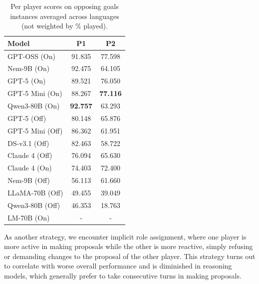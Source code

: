 \documentclass[../main.tex]{subfiles}
\begin{document}
\begin{table}[ht]
\centering
\footnotesize
\setlength{\tabcolsep}{4pt}
\begin{tabular}{l cc}
\hline
\textbf{Model} & \textbf{P1} & \textbf{P2} \\
\hline
GPT-OSS (On) & 91.835 & 77.598 \\
Nem-9B (On) & 92.475 & 64.105 \\
GPT-5 (On) & 89.521 & 76.050 \\
GPT-5 Mini (On) & 88.267 & \textbf{77.116} \\
Qwen3-80B (On) & \textbf{92.757} & 63.293 \\
GPT-5 (Off) & 80.148 & 65.876 \\
GPT-5 Mini (Off) & 86.362 & 61.951 \\
DS-v3.1 (Off) & 82.463 & 58.722 \\
Claude 4 (Off) & 76.094 & 65.630 \\
Claude 4 (On) & 74.403 & 72.400 \\
Nem-9B (Off) & 56.113 & 61.660 \\
LLaMA-70B (Off) & 49.455 & 39.049 \\
Qwen3-80B (Off) & 46.353 & 18.763 \\
LM-70B (On) & - & - \\
\hline
\end{tabular}
\caption{Per player scores on opposing goals instances averaged across languages (not weighted by \% played).}
\label{tab:air-balloon-player-scores-opp-goals}
\end{table}

As another strategy, we encounter implicit role assignment, where one player is more active in making proposals while the other is more reactive, simply refusing or demanding changes to the proposal of the other player. This strategy turns out to correlate with worse overall performance and is diminished in reasoning models, which generally prefer to take consecutive turns in making proposals.
\end{document}
